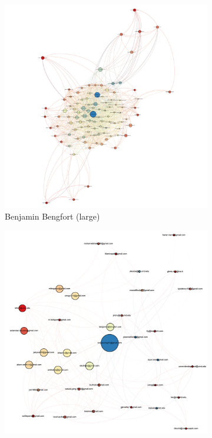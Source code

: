 \documentclass[11pt,letterpaper]{article}
\begin{document}

\begin{figure}[h]
	\centering
	\begin{subfigure}{0.49\textwidth}
		\centering
		\includegraphics[width=\textwidth]{figures/benjamin_simplification.png}
		\caption{\textsf{Benjamin Bengfort (large)}}
        \label{fig:benjamin_simplification}
	\end{subfigure} \hfill
	\begin{subfigure}{0.49\textwidth}
		\centering
		\includegraphics[width=\textwidth]{figures/kostas_simplification.png}

\end{subfigure}
\end{figure}
\end{document}
